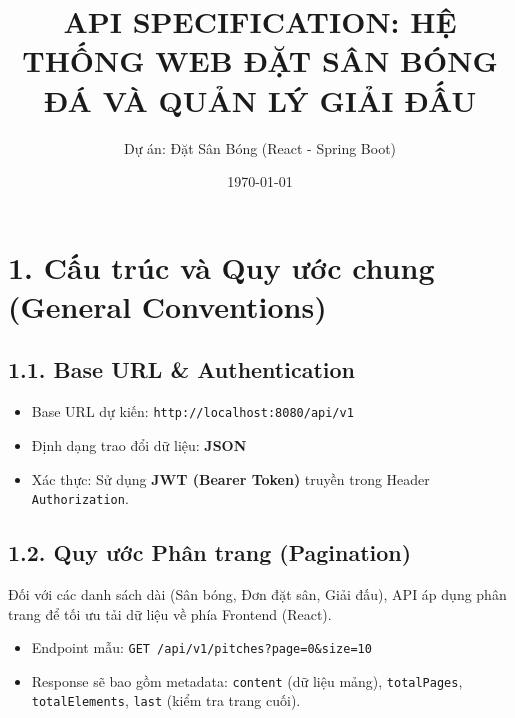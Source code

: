 \documentclass[12pt,a4paper]{article}
\title{\textbf{API SPECIFICATION: HỆ THỐNG WEB ĐẶT SÂN BÓNG ĐÁ VÀ QUẢN LÝ GIẢI ĐẤU}}
\author{Dự án: Đặt Sân Bóng (React - Spring Boot)}
\date{\today}
\begin{document}
\maketitle

\section*{1. Cấu trúc và Quy ước chung (General Conventions)}

\subsection*{1.1. Base URL \& Authentication}
\begin{itemize}[leftmargin=1.5cm]
    \item Base URL dự kiến: \texttt{http://localhost:8080/api/v1}
    \item Định dạng trao đổi dữ liệu: \textbf{JSON}
    \item Xác thực: Sử dụng \textbf{JWT (Bearer Token)} truyền trong Header \texttt{Authorization}.
\end{itemize}

\subsection*{1.2. Quy ước Phân trang (Pagination)}
Đối với các danh sách dài (Sân bóng, Đơn đặt sân, Giải đấu), API áp dụng phân trang để tối ưu tải dữ liệu về phía Frontend (React).
\begin{itemize}[leftmargin=1.5cm]
    \item Endpoint mẫu: \texttt{GET /api/v1/pitches?page=0\&size=10}
    \item Response sẽ bao gồm metadata: \texttt{content} (dữ liệu mảng), \texttt{totalPages}, \texttt{totalElements}, \texttt{last} (kiểm tra trang cuối).
\end{itemize}
\end{document}

